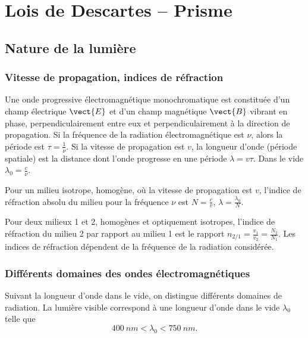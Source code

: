 \chapter{Lois de Descartes -- Prisme}
\label{chap:loisdedescartes}
\minitoc
\minilof
\minilot

\section{Nature de la lumière}
\label{chap6-sec:naturedelalumiere}

\subsection{Vitesse de propagation, indices de réfraction}
\label{chap6-subsec:vitessedepropagation}

Une onde progressive électromagnétique monochromatique est constituée d'un champ électrique $\vect{E}$ et d'un champ magnétique $\vect{B}$ vibrant en phase, perpendiculairement entre eux et perpendiculairement à la direction de propagation. 
Si la fréquence de la radiation électromagnétique est $\nu$, alors la période est $\tau = \frac{1}{\nu}$. Si la vitesse de propagation est $v$, la longueur d'onde (période spatiale) est la distance dont l'onde progresse en une période $\lambda = v \tau$. Dans le vide $\lambda_0 = \frac{c}{\nu}$.

Pour un milieu isotrope, homogène, où la vitesse de propagation est $v$, l'indice de réfraction absolu du milieu pour la fréquence $\nu$ est $N = \frac{c}{v}$, $\lambda =  \frac{\lambda_0}{N}$.

Pour deux milieux 1 et 2, homogènes et optiquement isotropes, l'indice de réfraction du milieu 2 par rapport au milieu 1 est le rapport $n_{2/1}= \frac{v_1}{v_2}=\frac{N_2}{N_1}$. Les indices de réfraction dépendent de la fréquence de la radiation considérée.

\subsection{Différents domaines des ondes électromagnétiques}
\label{chap6-subsec:domainesdesondes}

Suivant la longueur d'onde dans le vide, on distingue différents domaines de radiation. La lumière visible correspond à une longueur d'onde dans le vide $\lambda_0$ telle que
\begin{equation}
  \SI{400}{nm} < \lambda_0 < \SI{750}{nm}.
\end{equation}

